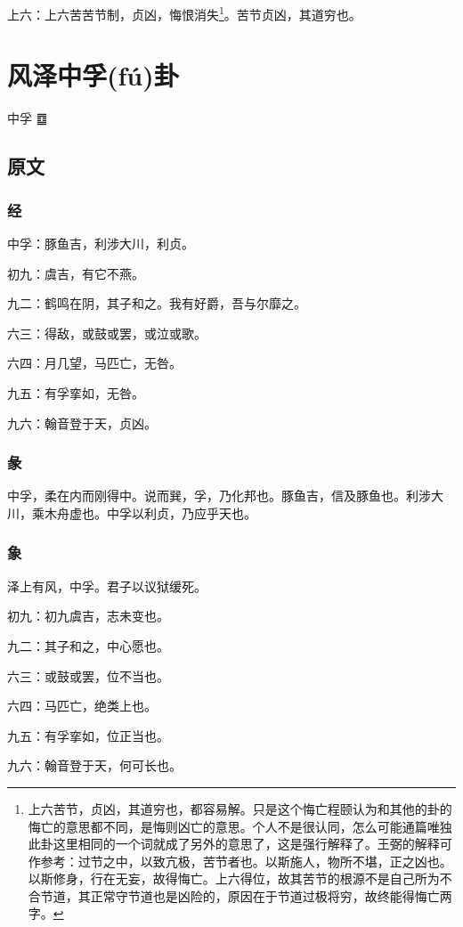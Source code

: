 \documentclass[12pt,oneside]{book}
\begin{document}
上六：上六苦苦节制，贞凶，悔恨消失\footnote{上六苦节，贞凶，其道穷也，都容易解。只是这个悔亡程颐认为和其他的卦的悔亡的意思都不同，是悔则凶亡的意思。个人不是很认同，怎么可能通篇唯独此卦这里相同的一个词就成了另外的意思了，这是强行解释了。王弼的解释可作参考：过节之中，以致亢极，苦节者也。以斯施人，物所不堪，正之凶也。以斯修身，行在无妄，故得悔亡。上六得位，故其苦节的根源不是自己所为不合节道，其正常守节道也是凶险的，原因在于节道过极将穷，故终能得悔亡两字。}。苦节贞凶，其道穷也。


\chapter{风泽中孚(fú)卦}
中孚 {\LARGE ䷼}


\section{原文}

\subsection{经}
中孚：豚鱼吉，利涉大川，利贞。

初九：虞吉，有它不燕。

九二：鹤鸣在阴，其子和之。我有好爵，吾与尔靡之。

六三：得敌，或鼓或罢，或泣或歌。

六四：月几望，马匹亡，无咎。

九五：有孚挛如，无咎。

九六：翰音登于天，贞凶。

\subsection{彖}
中孚，柔在内而刚得中。说而巽，孚，乃化邦也。豚鱼吉，信及豚鱼也。利涉大川，乘木舟虚也。中孚以利贞，乃应乎天也。

\subsection{象}
泽上有风，中孚。君子以议狱缓死。

初九：初九虞吉，志未变也。

九二：其子和之，中心愿也。

六三：或鼓或罢，位不当也。

六四：马匹亡，绝类上也。

九五：有孚挛如，位正当也。

九六：翰音登于天，何可长也。
\end{document}
